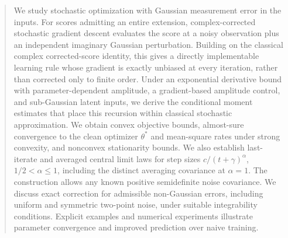 \begin{abstract}
We study stochastic optimization with Gaussian measurement error in the
inputs. For scores admitting an entire extension, complex-corrected
stochastic gradient descent evaluates the score at a noisy observation
plus an independent imaginary Gaussian perturbation. Building on the
classical complex corrected-score identity, this gives a directly
implementable learning rule whose gradient is exactly unbiased at every
iteration, rather than corrected only to finite order. Under an exponential
derivative bound with parameter-dependent amplitude, a gradient-based
amplitude control, and sub-Gaussian latent inputs, we derive the conditional
moment estimates that place this recursion within classical stochastic
approximation. We obtain convex objective bounds, almost-sure convergence
to the clean optimizer $\theta^*$ and mean-square rates under strong
convexity, and nonconvex stationarity bounds. We also establish
last-iterate and averaged central limit laws for step sizes
$c/(t+\gamma)^\alpha$, $1/2<\alpha\le1$, including the distinct averaging
covariance at $\alpha=1$. The construction allows any known positive
semidefinite noise covariance. We discuss exact correction for admissible
non-Gaussian errors, including uniform and symmetric two-point noise,
under suitable integrability conditions. Explicit examples and numerical
experiments illustrate parameter convergence and improved prediction
over naive training.
\end{abstract}
